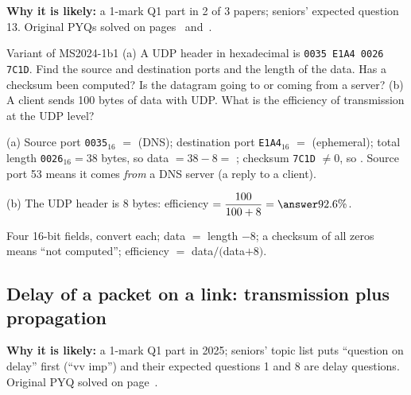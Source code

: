 \textbf{Why it is likely:} a 1-mark Q1 part in 2 of 3 papers; seniors' expected question 13. Original PYQs solved on pages~\pageref{q:MS2024-1b} and~\pageref{q:MS2022-1c}.

\begin{question}{Variant of MS2024-1b}{1}
(a) A UDP header in hexadecimal is \texttt{0035 E1A4 0026 7C1D}. Find the source and destination ports and the length of the data. Has a checksum been computed? Is the datagram going to or coming from a server?
(b) A client sends 100 bytes of data with UDP. What is the efficiency of transmission at the UDP level?
\end{question}
\begin{solution}
(a) Source port \texttt{0035}$_{16}$ $=$  (DNS); destination port \texttt{E1A4}$_{16}$ $=$  (ephemeral); total length \texttt{0026}$_{16}=38$ bytes, so data $=38-8=$ ; checksum \texttt{7C1D} $\neq 0$, so . Source port 53 means it comes \emph{from} a DNS server (a reply to a client).

(b) The UDP header is 8 bytes: efficiency $=\dfrac{100}{100+8}=\answer{92.6\%}$.
\end{solution}
\begin{answerplan}[1 mark]
Four 16-bit fields, convert each; data $=$ length $-8$; a checksum of all zeros means ``not computed''; efficiency $=$ data$/($data$+8)$.
\end{answerplan}

\subsection{Delay of a packet on a link: transmission plus propagation}\label{iq:C01}
    

\textbf{Why it is likely:} a 1-mark Q1 part in 2025; seniors' topic list puts ``question on delay'' first (``vv imp'') and their expected questions 1 and 8 are delay questions. Original PYQ solved on page~\pageref{q:MS2025-1a}.

